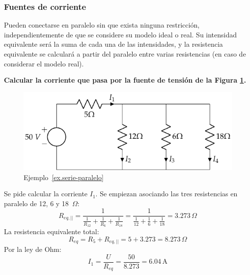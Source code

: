 		\subsubsection{Fuentes de corriente}
		
		Pueden conectarse en paralelo sin que exista ninguna restricción, independientemente de que se considere su modelo ideal o real. Su intensidad equivalente será la suma de cada una de las intensidades, y la resistencia equivalente se calculará a partir del paralelo entre varias resistencias (en caso de considerar el modelo real).
	
	
	\begin{example}\label{ex.serie-paralelo}
	    \textbf{Calcular la corriente que pasa por la fuente de tensión de la Figura \ref{fig.ejercicio1_tema1}.}
		\begin{figure}[H]
			\centering
			\includegraphics{../figs/ej1_BT1.pdf}
			\caption{Ejemplo~\ref{ex.serie-paralelo}}
			\label{fig.ejercicio1_tema1}
		\end{figure}
		
		Se pide calcular la corriente $I_1$. Se empiezan asociando las tres resistencias en paralelo de 12, 6 y 18~$\Omega$:
\begin{equation*}
    R_{eq,||}=\dfrac{1}{\frac{1}{R_{12}}+\frac{1}{R_{6}}+\frac{1}{R_{18}}}=\dfrac{1}{\frac{1}{12}+\frac{1}{6}+\frac{1}{18}}=3.273\,\Omega
\end{equation*}
La resistencia equivalente total:
\begin{equation*}
    R_{eq}=R_5+R_{eq,||}=5+3.273=8.273\,\Omega
\end{equation*}
Por la ley de Ohm: 
\begin{equation*}
    I_1=\dfrac{U}{R_{eq}}=\dfrac{50}{8.273}={6.04\,\text{A}}
\end{equation*}
	\end{example}
	
	
	
